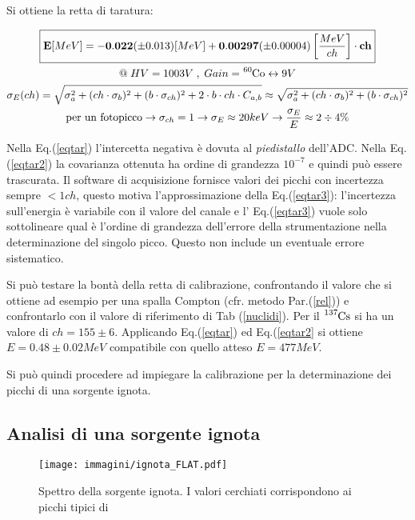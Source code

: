 \documentclass[12pt,a4paper,openright,twoside]{article}
\numberwithin{equation}{section} %
\begin{document}
Si ottiene la retta di taratura:

\begin{gather} \label{eqtar}
\boxed{ \mathbf{E} [MeV]=\mathbf{-0.022} (\pm 0.013) [MeV]+\mathbf{0.00297} (\pm 0.00004) \left[\frac{MeV}{ch}\right] \cdot \mathbf{ch}} \\
\mathbf{@} \; HV = 1003V\; , \; Gain=\ce{^{60}_{}Co} \leftrightarrow 9V \\ \label{eqtar2}
\sigma_E (ch)= \sqrt{\sigma_a^2 + (ch \cdot \sigma_b )^2 + (b\cdot \sigma_{ch})^2 + 2 \cdot b \cdot ch \cdot C_{a,b}} \approx \sqrt{\sigma_a^2 + (ch \cdot \sigma_b )^2 + (b\cdot \sigma_{ch})^2} \\\label{eqtar3}
\text{per un fotopicco} \rightarrow  \sigma_{ch} = 1 \rightarrow \sigma_E \approx 20keV \rightarrow  \frac{\sigma_E}{E} \approx 2 \div 4 \%
\end{gather}

Nella Eq.(\ref{eqtar}) l'intercetta negativa è dovuta al \textit{piedistallo} dell'ADC.
Nella Eq.(\ref{eqtar2}) la covarianza ottenuta ha ordine di grandezza $10^{-7}$ e quindi può essere trascurata.
Il software di acquisizione fornisce valori dei picchi con incertezza sempre $<1ch$, questo motiva l'approssimazione della Eq.(\ref{eqtar3}): l'incertezza sull'energia è variabile con il valore del canale e l' Eq.(\ref{eqtar3}) vuole solo sottolineare qual è l'ordine di grandezza dell'errore della strumentazione nella determinazione del singolo picco. Questo non include un eventuale errore sistematico.

Si può testare la bontà della retta di calibrazione, confrontando il valore che si ottiene ad esempio per una spalla Compton (cfr. metodo Par.(\ref{rel})) e confrontarlo con il valore di riferimento di Tab (\ref{nuclidi}). Per il $\ce{^{137}_{}Cs}$ si ha un valore di $ch=155 \pm 6$. Applicando Eq.(\ref{eqtar}) ed Eq.(\ref{eqtar2} si ottiene $E=0.48 \pm 0.02 MeV$ compatibile con quello atteso $E=477 MeV$.

Si può quindi procedere ad impiegare la calibrazione per la determinazione dei picchi di una sorgente ignota.

\pagebreak

\subsection{Analisi di una sorgente ignota}

\begin{figure}[hbtp]
\centering
\texttt{[image: immagini/ignota\_FLAT.pdf]}
\caption{Spettro della sorgente ignota. I valori cerchiati corrispondono ai picchi tipici di }
\label{ignota}
\end{figure}
\end{document}
